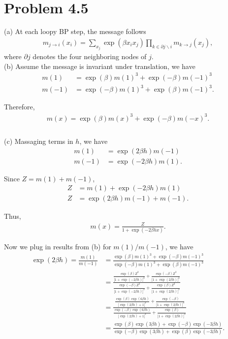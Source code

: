 \documentclass{article}
\begin{document}
 
\section*{Problem 4.5}
%
(a) At each loopy BP step, the message follows
\begin{align*}
	m_{j\to i}(x_i) = \sum_{x_j}\exp(\beta x_i x_j)\prod_{k\in \partial j \backslash i} m_{k\to j}(x_j),
\end{align*}
where $\partial j$ denotes the four neighboring nodes of $j$.
\\

\noindent
(b) Assume the message is invariant under translation, we have
\begin{align*}
	m(1) &= \exp(\beta)m(1)^3 + \exp(-\beta)m(-1)^3\\
	m(-1) &= \exp(-\beta)m(1)^3 + \exp(\beta)m(-1)^3.
\end{align*}
%

Therefore, 
\begin{align*}
	m(x) = \exp(\beta)m(x)^3 + \exp(-\beta)m(-x)^3.\\
\end{align*}
\\

\noindent
(c) Massaging terms in $h$, we have
\begin{align*}
	m(1) &= \exp(2\beta h)m(-1)\\
	m(-1) &= \exp(-2\beta h)m(1).
\end{align*}
%

Since $Z = m(1) + m(-1)$,
\begin{align*}
	Z &= m(1) + \exp(-2\beta h)m(1)\\
	Z &= \exp(2\beta h)m(-1) + m(-1).
\end{align*}
%

Thus,
\begin{align*}
	m(x) = \frac{Z}{1 + \exp(-2\beta h x)}.
\end{align*}
%

Now we plug in results from (b) for $m(1) / m(-1)$, we have
\begin{align*}
	\exp(2\beta h) = \frac{m(1)}{m(-1)} &=
	\frac{\exp(\beta)m(1)^3 + \exp(-\beta)m(-1)^3}{\exp(-\beta)m(1)^3 + \exp(\beta)m(-1)^3} \\
	&=\frac{\frac{\exp(\beta)Z^3}{\big[1 + \exp(-2\beta h)\big]^3} +
	  \frac{\exp(-\beta)Z^3}{\big[1 + \exp(2\beta h)\big]^3}}
	  {\frac{\exp(-\beta)Z^3}{\big[1 + \exp(-2\beta h)\big]^3} + 
	  \frac{\exp(\beta)Z^3}{\big[1 + \exp(2\beta h)\big]^3}}\\
	&=\frac{\frac{\exp(\beta)\exp(6\beta h)}{\big[\exp(2\beta h) + 1\big]^3} +
	  \frac{\exp(-\beta)}{\big[1 + \exp(2\beta h)\big]^3}}
	  {\frac{\exp(-\beta)\exp(6\beta h)}{\big[\exp(2\beta h) + 1\big]^3} + 
	  \frac{\exp(\beta)}{\big[1 + \exp(2\beta h)\big]^3}}\\
	&=\frac{\exp(\beta)\exp(3\beta h) +
	        \exp(-\beta)\exp(-3\beta h)}
	       {\exp(-\beta)\exp(3\beta h) +
	        \exp(\beta)\exp(-3\beta h)}.
\end{align*}
%
\end{document}
